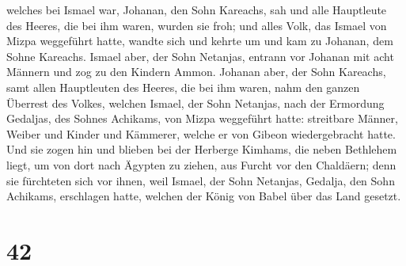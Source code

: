 welches bei Ismael war, Johanan, den Sohn Kareachs, sah und alle
Hauptleute des Heeres, die bei ihm waren, wurden sie froh;
 und alles Volk, das Ismael von Mizpa weggeführt hatte,
wandte sich und kehrte um und kam zu Johanan, dem Sohne Kareachs.
 Ismael aber, der Sohn Netanjas, entrann vor Johanan mit
acht Männern und zog zu den Kindern Ammon.  Johanan aber,
der Sohn Kareachs, samt allen Hauptleuten des Heeres, die bei ihm waren,
nahm den ganzen Überrest des Volkes, welchen Ismael, der Sohn Netanjas,
nach der Ermordung Gedaljas, des Sohnes Achikams, von Mizpa weggeführt
hatte: streitbare Männer, Weiber und Kinder und Kämmerer, welche er von
Gibeon wiedergebracht hatte.  Und sie zogen hin und
blieben bei der Herberge Kimhams, die neben Bethlehem liegt, um von dort
nach Ägypten zu ziehen,  aus Furcht vor den Chaldäern;
denn sie fürchteten sich vor ihnen, weil Ismael, der Sohn Netanjas,
Gedalja, den Sohn Achikams, erschlagen hatte, welchen der König von
Babel über das Land gesetzt.

\hypertarget{section-41}{%
\section{42}\label{section-41}}

